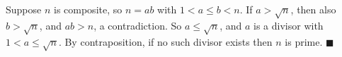 Suppose $n$ is composite, so $n=ab$ with $1<a\le b<n$. If $a>\sqrt n$, then also $b>\sqrt n$, and $ab>n$, a contradiction. So $a\le\sqrt n$, and $a$ is a divisor with $1<a\le\sqrt n$. By contraposition, if no such divisor exists then $n$ is prime. $\blacksquare$
